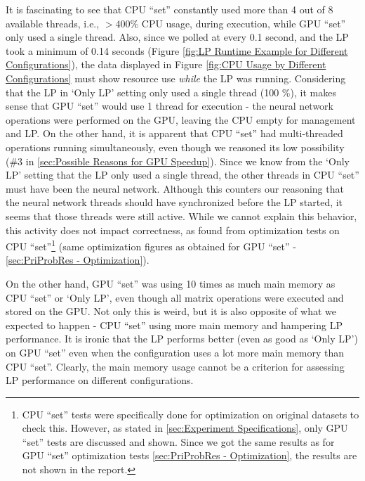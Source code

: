 \begin{appendices}
    It is fascinating to see that CPU ``set'' constantly used more than 4 out of 8 available threads, i.e., $>400 \%$ CPU usage, during execution, while GPU ``set'' only used a single thread. Also, since we polled at every 0.1 second, and the LP took a minimum of 0.14 seconds (Figure \ref{fig:LP Runtime Example for Different Configurations}), the data displayed in Figure \ref{fig:CPU Usage by Different Configurations} must show resource use \textit{while} the LP was running. Considering that the LP in `Only LP' setting only used a single thread (100 \%), it makes sense that GPU ``set'' would use 1 thread for execution - the neural network operations were performed on the GPU, leaving the CPU empty for management and LP. On the other hand, it is apparent that CPU ``set'' had multi-threaded operations running simultaneously, even though we reasoned its low possibility (\#3 in \cref{sec:Possible Reasons for GPU Speedup}). Since we know from the `Only LP' setting that the LP only used a single thread, the other threads in CPU ``set'' must have been the neural network. Although this counters our reasoning that the neural network threads should have synchronized before the LP started, it seems that those threads were still active. While we cannot explain this behavior, this activity does not impact correctness, as found from optimization tests on CPU ``set''\footnote{CPU ``set'' tests were specifically done for optimization on original datasets to check this. However, as stated in \cref{sec:Experiment Specifications}, only GPU ``set'' tests are discussed and shown. Since we got the same results as for GPU ``set'' optimization tests \cref{sec:PriProbRes - Optimization}, the results are not shown in the report.} (same optimization figures as obtained for GPU ``set'' - \cref{sec:PriProbRes - Optimization}).
    
    On the other hand, GPU ``set'' was using 10 times as much main memory as CPU ``set'' or `Only LP', even though all matrix operations were executed and stored on the GPU. Not only this is weird, but it is also opposite of what we expected to happen - CPU ``set'' using more main memory and hampering LP performance. It is ironic that the LP performs better (even as good as `Only LP') on GPU ``set'' even when the configuration uses a lot more main memory than CPU ``set''. Clearly, the main memory usage cannot be a criterion for assessing LP performance on different configurations.
    \begin{figure}[!htbp]
        \centering
        \begin{minipage}{.49\textwidth}
            \centering
\end{minipage}
\end{figure}
\end{appendices}
